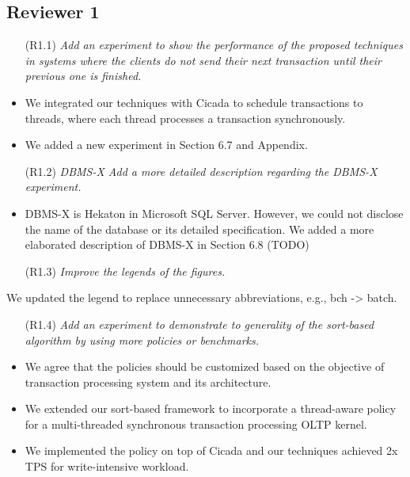 \documentclass{article}
\newcommand{\changed}[1]{#1}
\newcommand{\changed}[1]{{\color{blue}#1}}
\begin{document}
\subsection{Reviewer 1}

\begin{itemize}
\item[(R1.1)] \emph{Add an experiment to show the performance of the proposed techniques in systems where the clients do not send their next transaction until their previous one is finished.}
\end{itemize}
\changed{
	\begin{itemize}
		\item We integrated our techniques with Cicada to schedule transactions to threads, where each thread processes a transaction synchronously.
		\item We added a new experiment in Section 6.7 and Appendix.
	\end{itemize}
}

\begin{itemize}
\item[(R1.2)] \emph{DBMS-X Add a more detailed description regarding the DBMS-X experiment.}
\end{itemize}

\changed{
	\begin{itemize}
	\item DBMS-X is Hekaton in Microsoft SQL Server. However, we could not disclose the name of the database or its detailed specification. We added a more elaborated description of DBMS-X in Section 6.8 (TODO) \end{itemize}
}

\begin{itemize}
\item[(R1.3)] \emph{Improve the legends of the figures.}
\end{itemize}

\changed{
	We updated the legend to replace unnecessary abbreviations, e.g., bch -> batch.
}

\begin{itemize}
\item[(R1.4)] \emph{Add an experiment to demonstrate to generality of the sort-based algorithm by using more policies or benchmarks.}
\end{itemize}

\changed{
	\begin{itemize}
		\item We agree that the policies should be customized based on the objective of transaction processing system and its architecture.
		\item We extended our sort-based framework to incorporate a thread-aware policy for a multi-threaded synchronous transaction processing OLTP kernel.
		\item We implemented the policy on top of Cicada and our techniques achieved 2x TPS for write-intensive workload.
	\end{itemize}
}
\end{document}
